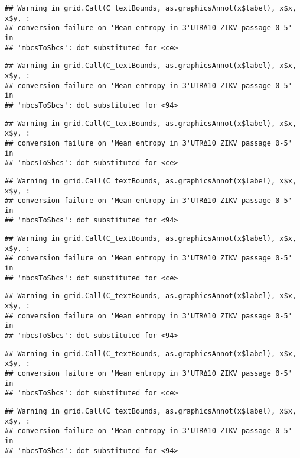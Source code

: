 \documentclass[
]{article}
\begin{document}
\begin{verbatim}
## Warning in grid.Call(C_textBounds, as.graphicsAnnot(x$label), x$x, x$y, :
## conversion failure on 'Mean entropy in 3'UTRΔ10 ZIKV passage 0-5' in
## 'mbcsToSbcs': dot substituted for <ce>
\end{verbatim}

\begin{verbatim}
## Warning in grid.Call(C_textBounds, as.graphicsAnnot(x$label), x$x, x$y, :
## conversion failure on 'Mean entropy in 3'UTRΔ10 ZIKV passage 0-5' in
## 'mbcsToSbcs': dot substituted for <94>
\end{verbatim}

\begin{verbatim}
## Warning in grid.Call(C_textBounds, as.graphicsAnnot(x$label), x$x, x$y, :
## conversion failure on 'Mean entropy in 3'UTRΔ10 ZIKV passage 0-5' in
## 'mbcsToSbcs': dot substituted for <ce>
\end{verbatim}

\begin{verbatim}
## Warning in grid.Call(C_textBounds, as.graphicsAnnot(x$label), x$x, x$y, :
## conversion failure on 'Mean entropy in 3'UTRΔ10 ZIKV passage 0-5' in
## 'mbcsToSbcs': dot substituted for <94>
\end{verbatim}

\begin{verbatim}
## Warning in grid.Call(C_textBounds, as.graphicsAnnot(x$label), x$x, x$y, :
## conversion failure on 'Mean entropy in 3'UTRΔ10 ZIKV passage 0-5' in
## 'mbcsToSbcs': dot substituted for <ce>
\end{verbatim}

\begin{verbatim}
## Warning in grid.Call(C_textBounds, as.graphicsAnnot(x$label), x$x, x$y, :
## conversion failure on 'Mean entropy in 3'UTRΔ10 ZIKV passage 0-5' in
## 'mbcsToSbcs': dot substituted for <94>
\end{verbatim}

\begin{verbatim}
## Warning in grid.Call(C_textBounds, as.graphicsAnnot(x$label), x$x, x$y, :
## conversion failure on 'Mean entropy in 3'UTRΔ10 ZIKV passage 0-5' in
## 'mbcsToSbcs': dot substituted for <ce>
\end{verbatim}

\begin{verbatim}
## Warning in grid.Call(C_textBounds, as.graphicsAnnot(x$label), x$x, x$y, :
## conversion failure on 'Mean entropy in 3'UTRΔ10 ZIKV passage 0-5' in
## 'mbcsToSbcs': dot substituted for <94>
\end{verbatim}
\end{document}
